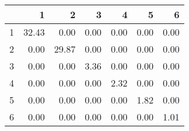 \begin{table}[ht]
\centering
\begin{tabular}{rrrrrrr}
  \hline
 & 1 & 2 & 3 & 4 & 5 & 6 \\ 
  \hline
1 & 32.43 & 0.00 & 0.00 & 0.00 & 0.00 & 0.00 \\ 
  2 & 0.00 & 29.87 & 0.00 & 0.00 & 0.00 & 0.00 \\ 
  3 & 0.00 & 0.00 & 3.36 & 0.00 & 0.00 & 0.00 \\ 
  4 & 0.00 & 0.00 & 0.00 & 2.32 & 0.00 & 0.00 \\ 
  5 & 0.00 & 0.00 & 0.00 & 0.00 & 1.82 & 0.00 \\ 
  6 & 0.00 & 0.00 & 0.00 & 0.00 & 0.00 & 1.01 \\ 
   \hline
\end{tabular}
\end{table}
